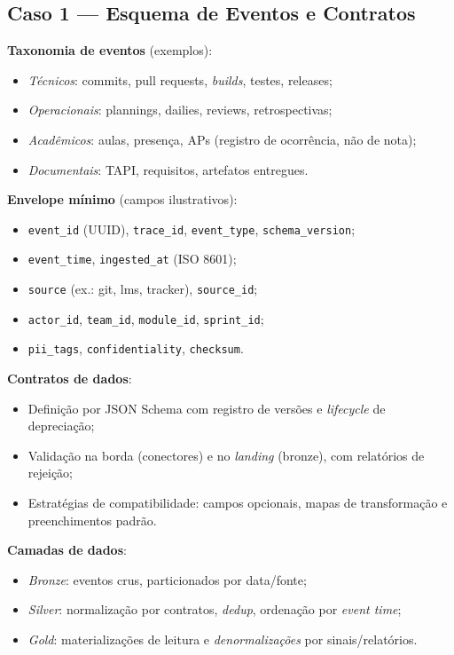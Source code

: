 \subsection{Caso 1 — Esquema de Eventos e Contratos}

\textbf{Taxonomia de eventos} (exemplos):
\begin{itemize}
  \item \textit{Técnicos}: commits, pull requests, \textit{builds}, testes, releases;
  \item \textit{Operacionais}: plannings, dailies, reviews, retrospectivas;
  \item \textit{Acadêmicos}: aulas, presença, APs (registro de ocorrência, não de nota);
  \item \textit{Documentais}: TAPI, requisitos, artefatos entregues.
\end{itemize}

\textbf{Envelope mínimo} (campos ilustrativos):
\begin{itemize}
  \item \texttt{event\_id} (UUID), \texttt{trace\_id}, \texttt{event\_type}, \texttt{schema\_version};
  \item \texttt{event\_time}, \texttt{ingested\_at} (ISO 8601);
  \item \texttt{source} (ex.: git, lms, tracker), \texttt{source\_id};
  \item \texttt{actor\_id}, \texttt{team\_id}, \texttt{module\_id}, \texttt{sprint\_id};
  \item \texttt{pii\_tags}, \texttt{confidentiality}, \texttt{checksum}.
\end{itemize}

\textbf{Contratos de dados}:
\begin{itemize}
  \item Definição por JSON Schema com registro de versões e \textit{lifecycle} de depreciação;
  \item Validação na borda (conectores) e no \textit{landing} (bronze), com relatórios de rejeição;
  \item Estratégias de compatibilidade: campos opcionais, mapas de transformação e preenchimentos padrão.
\end{itemize}

\textbf{Camadas de dados}:
\begin{itemize}
  \item \textit{Bronze}: eventos crus, particionados por data/fonte;
  \item \textit{Silver}: normalização por contratos, \textit{dedup}, ordenação por \textit{event time};
  \item \textit{Gold}: materializações de leitura e \textit{denormalizações} por sinais/relatórios.
\end{itemize}


